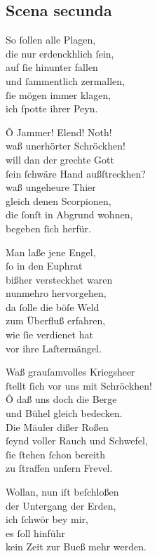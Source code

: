 \documentclass{ees}
\newenvironment{lyrics}[1]{%
  \subsection{#1}\nopagebreak%
  \begin{lyricslist}%
  \let\voice\item%
}{%
  \end{lyricslist}%
}
\begin{document}
\begin{lyrics}{Scena secunda}
  \voice[Judex]
  So ſollen alle Plagen,\\
  die nur erdenckhlich ſein,\\
  auf ſie hinunter fallen\\
  und ſammentlich zermallen,\\
  ſie mögen immer klagen,\\
  ich ſpotte ihrer Peyn.

  \voice[Chorus]
  Ô Jammer! Elend! Noth!\\
  waß unerhörter Schröckhen!\\
  will dan der grechte Gott\\
  ſein ſchwäre Hand außſtreckhen?\\
  waß ungeheure Thier\\
  gleich denen Scorpionen,\\
  die ſonſt in Abgrund wohnen,\\
  begeben ſich herfür.

  \voice[Judex]
  Man laße jene Engel,\\
  ſo in den Euphrat\\
  bißher versteckhet waren\\
  nunmehro hervorgehen,\\
  da ſolle die böſe Weld\\
  zum Überfluß erfahren,\\
  wie ſie verdienet hat\\
  vor ihre Laſtermängel.

  \voice[Chorus]
  Waß grauſamvolles Kriegsheer\\
  ſtellt ſich vor uns mit Schröckhen!\\
  Ô daß uns doch die Berge\\
  und Bühel gleich bedecken.\\
  Die Mäuler dißer Roßen\\
  ſeynd voller Rauch und Schwefel,\\
  ſie ſtehen ſchon bereith\\
  zu ſtraffen unſern Frevel.

  \voice[Judex]
  Wollan, nun iſt beſchloßen\\
  der Untergang der Erden,\\
  ich ſchwör bey mir,\\
  es ſoll hinführ\\
  kein Zeit zur Bueß mehr werden.
\end{lyrics}
\end{document}
